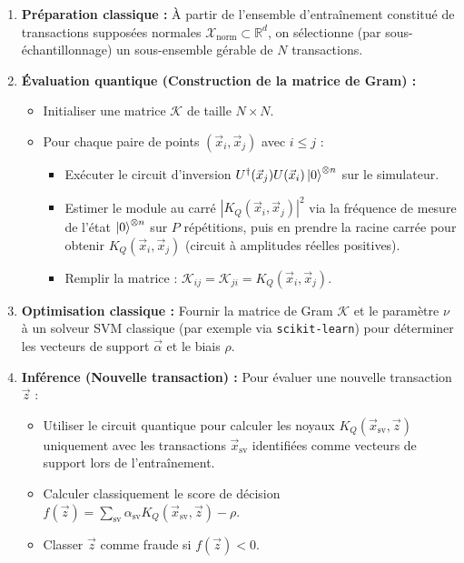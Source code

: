 \documentclass[a4paper]{article}
\begin{document}
\begin{enumerate}
    \item \textbf{Préparation classique :} À partir de l'ensemble d'entraînement constitué de transactions supposées normales $\mathcal{X}_{\text{norm}} \subset \mathbb{R}^d$, on sélectionne (par sous-échantillonnage) un sous-ensemble gérable de $N$ transactions.
    \item \textbf{Évaluation quantique (Construction de la matrice de Gram) :}
    \begin{itemize}
        \item Initialiser une matrice $\mathcal{K}$ de taille $N \times N$.
        \item Pour chaque paire de points $(\vec{x}_i, \vec{x}_j)$ avec $i \leq j$ :
        \begin{itemize}
            \item Exécuter le circuit d'inversion $U^\dagger(\vec{x}_j) U(\vec{x}_i)\ket{0}^{\otimes n}$ sur le simulateur.
            \item Estimer le module au carré $|K_Q(\vec{x}_i, \vec{x}_j)|^2$ via la fréquence de mesure de l'état $\ket{0}^{\otimes n}$ sur $P$ répétitions, puis en prendre la racine carrée pour obtenir $K_Q(\vec{x}_i, \vec{x}_j)$ (circuit à amplitudes réelles positives).
            \item Remplir la matrice : $\mathcal{K}_{ij} = \mathcal{K}_{ji} = K_Q(\vec{x}_i, \vec{x}_j)$.
        \end{itemize}
    \end{itemize}
    \item \textbf{Optimisation classique :} Fournir la matrice de Gram $\mathcal{K}$ et le paramètre $\nu$ à un solveur SVM classique (par exemple via \texttt{scikit-learn}) pour déterminer les vecteurs de support $\vec{\alpha}$ et le biais $\rho$.
    \item \textbf{Inférence (Nouvelle transaction) :} Pour évaluer une nouvelle transaction $\vec{z}$ :
    \begin{itemize}
        \item Utiliser le circuit quantique pour calculer les noyaux $K_Q(\vec{x}_{\text{sv}}, \vec{z})$ uniquement avec les transactions $\vec{x}_{\text{sv}}$ identifiées comme vecteurs de support lors de l'entraînement.
        \item Calculer classiquement le score de décision $f(\vec{z}) = \sum_{\text{sv}} \alpha_{\text{sv}} K_Q(\vec{x}_{\text{sv}}, \vec{z}) - \rho$.
        \item Classer $\vec{z}$ comme fraude si $f(\vec{z}) < 0$.
    \end{itemize}
\end{enumerate}
\end{document}
